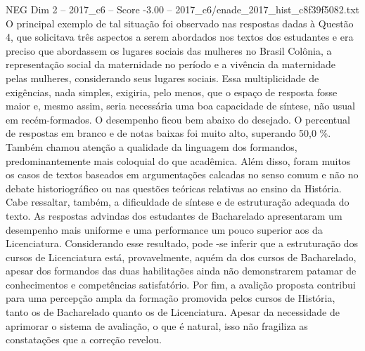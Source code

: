 \begin{textsample}{NEG Dim 2 – 2017\_c6 – Score -3.00 – 2017\_c6/enade\_2017\_hist\_c8f39f5082.txt}
O principal exemplo de tal situação foi observado nas respostas dadas à Questão 4, que solicitava três aspectos a serem abordados nos textos dos estudantes e era preciso que abordassem os lugares sociais das mulheres no Brasil Colônia, a representação social da maternidade no período e a vivência da maternidade pelas mulheres, considerando seus lugares sociais.
Essa multiplicidade de exigências, nada simples, exigiria, pelo menos, que o espaço de resposta fosse maior e, mesmo assim, seria necessária uma boa capacidade de síntese, não usual em recém-formados.
O desempenho ficou bem abaixo do desejado.
O percentual de respostas em branco e de notas baixas foi muito alto, superando 50,0 \%.
Também chamou atenção a qualidade da linguagem dos formandos, predominantemente mais coloquial do que acadêmica.
Além disso, foram muitos os casos de textos baseados em argumentações calcadas no senso comum e não no debate historiográfico ou nas questões teóricas relativas ao ensino da História.
Cabe ressaltar, também, a dificuldade de síntese e de estruturação adequada do texto.
As respostas advindas dos estudantes de Bacharelado apresentaram um desempenho mais uniforme e uma performance um pouco superior aos da Licenciatura.
Considerando esse resultado, pode -se inferir que a estruturação dos cursos de Licenciatura está, provavelmente, aquém da dos cursos de Bacharelado, apesar dos formandos das duas habilitações ainda não demonstrarem patamar de conhecimentos e competências satisfatório.
Por fim, a avalição proposta contribui para uma percepção ampla da formação promovida pelos cursos de História, tanto os de Bacharelado quanto os de Licenciatura.
Apesar da necessidade de aprimorar o sistema de avaliação, o que é natural, isso não fragiliza as constatações que a correção revelou.

\end{textsample}
